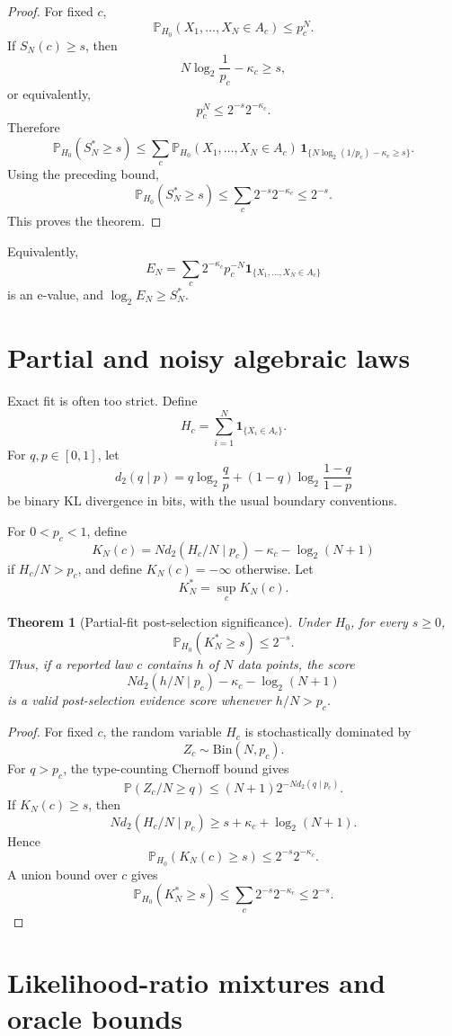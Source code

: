 \documentclass[11pt]{article}
\newtheorem{theorem}{Theorem}[section]
\begin{document}
\begin{proof}
For fixed $c$,
\[
\mathbb P_{H_0}(X_1,\dots,X_N\in A_c)\le p_c^N.
\]
If $S_N(c)\ge s$, then
\[
N\log_2\frac1{p_c}-\kappa_c\ge s,
\]
or equivalently,
\[
p_c^N\le2^{-s}2^{-\kappa_c}.
\]
Therefore
\[
\mathbb P_{H_0}(S_N^*\ge s)
\le
\sum_c
\mathbb P_{H_0}(X_1,\dots,X_N\in A_c)\,
\mathbf 1_{\{N\log_2(1/p_c)-\kappa_c\ge s\}}.
\]
Using the preceding bound,
\[
\mathbb P_{H_0}(S_N^*\ge s)
\le
\sum_c2^{-s}2^{-\kappa_c}
\le2^{-s}.
\]
This proves the theorem.
\end{proof}

Equivalently,
\[
E_N=\sum_c2^{-\kappa_c}p_c^{-N}\mathbf 1_{\{X_1,\dots,X_N\in A_c\}}
\]
is an e-value, and $\log_2E_N\ge S_N^*$.

\section{Partial and noisy algebraic laws}

Exact fit is often too strict. Define
\[
H_c=\sum_{i=1}^N\mathbf 1_{\{X_i\in A_c\}}.
\]
For $q,p\in[0,1]$, let
\[
d_2(q\mid p)
=
q\log_2\frac qp
+
(1-q)\log_2\frac{1-q}{1-p}
\]
be binary KL divergence in bits, with the usual boundary conventions.

For $0<p_c<1$, define
\[
K_N(c)
=
N d_2(H_c/N\mid p_c)
-\kappa_c-\log_2(N+1)
\]
if $H_c/N>p_c$, and define $K_N(c)=-\infty$ otherwise. Let
\[
K_N^*=\sup_cK_N(c).
\]

\begin{theorem}[Partial-fit post-selection significance]
Under $H_0$, for every $s\ge0$,
\[
\mathbb P_{H_0}(K_N^*\ge s)\le2^{-s}.
\]
Thus, if a reported law $c$ contains $h$ of $N$ data points, the score
\[
N d_2(h/N\mid p_c)-\kappa_c-\log_2(N+1)
\]
is a valid post-selection evidence score whenever $h/N>p_c$.
\end{theorem}

\begin{proof}
For fixed $c$, the random variable $H_c$ is stochastically dominated by
\[
Z_c\sim\mathrm{Bin}(N,p_c).
\]
For $q>p_c$, the type-counting Chernoff bound gives
\[
\mathbb P(Z_c/N\ge q)
\le
(N+1)2^{-Nd_2(q\mid p_c)}.
\]
If $K_N(c)\ge s$, then
\[
Nd_2(H_c/N\mid p_c)
\ge
s+\kappa_c+\log_2(N+1).
\]
Hence
\[
\mathbb P_{H_0}(K_N(c)\ge s)
\le
2^{-s}2^{-\kappa_c}.
\]
A union bound over $c$ gives
\[
\mathbb P_{H_0}(K_N^*\ge s)
\le
\sum_c2^{-s}2^{-\kappa_c}
\le2^{-s}.
\]
\end{proof}

\section{Likelihood-ratio mixtures and oracle bounds}
\end{document}

